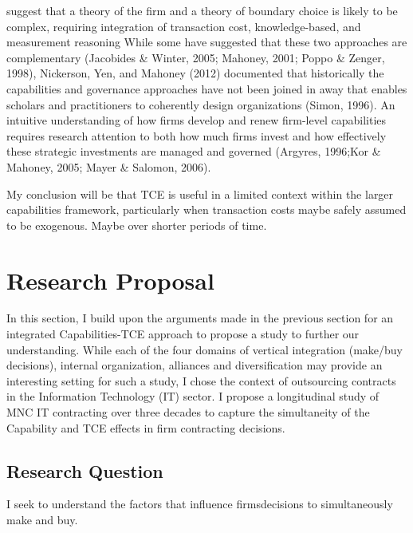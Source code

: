\documentclass[12pt,letterpaper]{article}
\begin{document}
\cite{Poppo1998}  suggest that a theory of the firm and a theory of boundary choice is likely to be complex, requiring integration of transaction cost, knowledge-based, and measurement reasoning While some have suggested that these two approaches are complementary (Jacobides \& Winter, 2005; Mahoney, 2001; Poppo \& Zenger, 1998), Nickerson, Yen, and Mahoney (2012) documented
that historically the capabilities and governance approaches have not been joined in away that enables scholars and practitioners to coherently design organizations (Simon, 1996). An intuitive understanding of how firms develop and renew firm-level capabilities
requires research attention to both how much firms invest and how effectively these strategic investments are managed and governed (Argyres, 1996;Kor \& Mahoney, 2005; Mayer \& Salomon, 2006).

My conclusion will be that TCE is useful in a limited context within the larger capabilities framework, particularly when transaction costs maybe safely assumed to be exogenous. Maybe over shorter periods of time.

\section{Research Proposal}
In this section, I build upon the arguments made in the previous section for an integrated Capabilities-TCE approach to propose a study to further our understanding. While each of the four domains of vertical integration (make/buy decisions), internal organization, alliances and diversification may provide an interesting setting for such a study, I chose the context of outsourcing contracts in the Information Technology (IT) sector. I propose a longitudinal study of MNC IT contracting over three decades to capture the simultaneity of the Capability and TCE effects in firm contracting decisions.

\subsection{Research Question}
I seek to understand the factors that influence firms\textquotesingle decisions to simultaneously make and buy.
\end{document}
